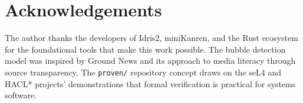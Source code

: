 \documentclass[11pt,twocolumn]{article}
\begin{document}
\section*{Acknowledgements}

The author thanks the developers of Idris2, miniKanren, and the Rust
ecosystem for the foundational tools that make this work possible.
The bubble detection model was inspired by Ground News and its approach
to media literacy through source transparency. The \texttt{proven/}
repository concept draws on the seL4 and HACL* projects'
demonstrations that formal verification is practical for systems
software.


\end{document}
